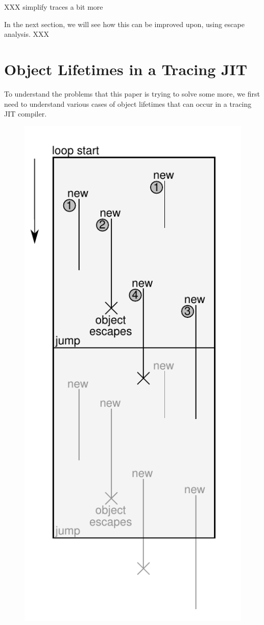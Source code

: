 \documentclass{sigplanconf}
\begin{document}
XXX simplify traces a bit more

In the next section, we will see how this can be improved upon, using escape
analysis. XXX

\section{Object Lifetimes in a Tracing JIT}
\label{sec:lifetimes}


To understand the problems that this paper is trying to solve some more, we
first need to understand various cases of object lifetimes that can occur in a
tracing JIT compiler.

\begin{figure}
\begin{center}
\includegraphics[scale=0.6]{figures/obj-lifetime.pdf}
\end{center}


\end{figure}
\end{document}
